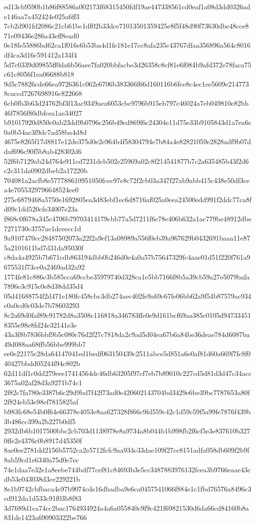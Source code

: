 {ed13cb9590b1b86f88586a002173f68315450fdf19ae447338561cd0eaf1a08d3dd0326ade146aa7a452424e025a6ff3
7cb2d901fd2086c21cb61bc1df02b33dce71013501359425e8f5f48d90f73630dbe48cce871e09436e286a43eff8ead0
0e18fe55886bd62ca1f016e6b53ba4d1fe181e17cc8afa235c43767dfaa356896a564c8016df4ca3d16c591412a134f4
5d7c0339d09855ff0da6b56aee7fa020bbfacbe3d26358c8cf81e6f084b9afd372e78faca75c61c8056f1ea06688b818
9d5c78826cde66ea9726361c062e6706b383366f66d160116b6fce8c4ec1ee5609e2147738caccd7267698916c822668
6cb0fb3b63d24762bf3f13ac9349aea6053cbc9796b915eb797c46024a7eb049810e82bb46f7856f80dbfcea1ae34027
b91017920d850c0ab23dd9b0796c256b49ed869f6c24304e11d75e33b9105843d1a7ea6c0a0b54ac3f9dc7ad58ba4d8d
4675e8265f17d8817e12de375d0e2e964b4f58304794e7b84a4e82821059e2828adf9b07ddaf696c90f5b8ab428302d6
52f6b7129ab24d764e911cd7231dcb502e25969a02c8f214541877b7c2a635485b43f2d6c2c311da0902dbeb2a17220b
704081a2acfb8e577788610951050fcec97e8c72f2cb03a347f27ab9abb415c438e50df3cea4e7055329796648524ee0
275c6879468a5750e1692805ea3d83ebf1ec6d8716af025a0eea24500edd991f2ddc77ca8fd09c1dd520cfe34007e23a
f868c0f678a345c4706b79703414179cbb77a5d7211f6c78e406b632a1ac779be48912dbe7271730c3757ae1dceecc1d
9a9107470cc28487502073a22f2a9ef13a08989a556f0eb39a967629b0432691baaa11e875a2101611bd7d31da95030f
c8da4a4925b7b671cdb863194dbb0b246d0e4a0a57b75647329fc4aae01d51f220f761a9675531f73ce0a2469ad32a92
1774fe81c886c3b585cca69ccbe35979740d328ca1e5bb7166f8b5a39cb59a27e5079bafa7896c3c915c0e8d38dd35d4
05d41688754f2d471e180fc458cbc3db274aec402fe9a69c67fe06bb62a9f54b87579ac934c0a0cd0c03de7b78603293
8c2a69d0faf89c91782d8a3508c116818a346783ffe0e9d161bcf69aa385c0105d947334518355e98e8fd24e32141e3e
43a3f8b7836bbf9b5c080c76d2f27c7818da2c9ad5d04ea67b6a84be36deae784d6087ba49d088aa68ffb56bbe999bb7
ee0e22175c28da64147041ed1bedf063150439c2511abce5d851a6e0af81d60a669f7fc8f040427bbdd05244f94c802b
62d11df1c0dd279eee17414564dc46db63205f97cf7eb7b89010c227cd5d81d3d47c34acc3675a02af28d3a9271b74c1
2f82c7fa780e3387b6c29d9bd7f42f73ad0e420602143704bd3429e6be39bc7787653a80f2f824eb53e98ef7815825af
b983fc68e54b0f64e66378e4053e8aa627328f866c9fd559c42c1d59c59f5a99fe7876f439b3b486cc399a2b227b0df5
2932db6b1017500bbc2cb703d1138978e8a9734a8b044b1b998fb2f6cf5e3e837610b3270ffe2e4376c0b8917d45350f
8ae0ee2781dd2156b5752ca2e5712fcfc9aa934c33dae109f27cc8151adfa058db609f2b9f8ab59cd1e6340a75d0e7ec
74e1daa7e32e1a8eebe744bdf77cef81c84693b3e5cc3487883976132fcea3b9766eaae43cdb53e043038d3ce229221b
8e1b9742cbfbaca4e97b9074cde16dbadba9e6ca0457541066f884e1c1fbd76576a8496c3cd912da1d533c91f03b8f83
3d7689d1ca74cc2bac1764934924a4a6a055840c9f9c421f69821530d6da66cd84160b8a831de1423a690903322be766
}
